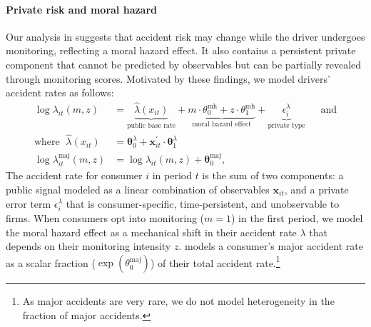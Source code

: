 \paragraph{Private risk and moral hazard}
Our analysis in  suggests that accident risk may change while the driver undergoes monitoring, reflecting a moral hazard effect. It also contains a persistent private component that cannot be predicted by observables but can be partially revealed through monitoring scores. Motivated by these findings, we model drivers' accident rates as follows:
\begin{align}
    \log \lambda_{it}(m,z) & = \underbrace{\hat{\lambda}(x_{it})}_\text{public base rate} + \underbrace{m\cdot\theta^{\text{mh}}_0 + z\cdot\theta^{\text{mh}}_1}_\text{moral hazard effect} + \underbrace{\epsilon^{\lambda}_{i}}_\text{private type} \label{eq:lambda_model} \; \quad \; \text{and} \\
    \text{where } \;  \hat{\lambda}(x_{it}) & = \mathbf{\theta}^{\lambda}_{0} + \mathbf{x}_{it}^\prime \cdot \mathbf{\theta}^{\lambda}_{1} \\
    \log \lambda_{it}^{\mathrm{maj}}(m,z) & = \log \lambda_{it}(m, z) + {\mathbf{\theta}^{\mathrm{maj}}_{0}}, \label{eq:lambda_model2}
\end{align}
The accident rate for consumer $i$ in period $t$ is the sum of two components: a public signal modeled as a linear combination of observables $\mathbf{x}_{it}$, and a private error term $\epsilon^{\lambda}_{i}$ that is consumer-specific, time-persistent, and unobservable to firms. When consumers opt into monitoring ($m=1$) in the first period, we model the moral hazard effect as a mechanical shift in their accident rate $\lambda$ that depends on their monitoring intensity $z$.
 models a consumer's major accident rate as a scalar fraction ($\exp(\theta^{\mathrm{maj}}_0)$) of their total accident rate.\footnote{As major accidents are very rare, we do not model heterogeneity in the fraction of major accidents.}


